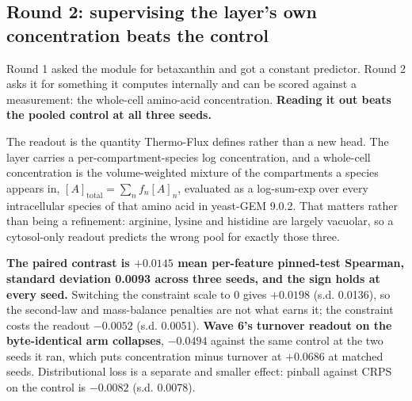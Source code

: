 \subsection{Round 2: supervising the layer's own concentration beats the control}
\label{sec:wave7-aa}

Round 1 asked the module for betaxanthin and got a constant predictor. Round 2 asks it for
something it computes internally and can be scored against a measurement: the whole-cell
amino-acid concentration. \textbf{Reading it out beats the pooled control at all three
seeds.}

The readout is the quantity Thermo-Flux defines rather than a new head. The layer carries a
per-compartment-species log concentration, and a whole-cell concentration is the
volume-weighted mixture of the compartments a species appears in,
$[A]_{\mathrm{total}} = \sum_n f_n [A]_n$, evaluated as a log-sum-exp over every
intracellular species of that amino acid in yeast-GEM 9.0.2. That matters rather than being
a refinement: arginine, lysine and histidine are largely vacuolar, so a cytosol-only readout
predicts the wrong pool for exactly those three.



\textbf{The paired contrast is $+0.0145$ mean per-feature pinned-test Spearman, standard
deviation 0.0093 across three seeds, and the sign holds at every seed.} Switching the
constraint scale to 0 gives $+0.0198$ (s.d. 0.0136), so the second-law and mass-balance
penalties are not what earns it; the constraint costs the readout $-0.0052$ (s.d. 0.0051).
\textbf{Wave 6's turnover readout on the byte-identical arm collapses}, $-0.0494$ against
the same control at the two seeds it ran, which puts concentration minus turnover at
$+0.0686$ at matched seeds. Distributional loss is a separate and smaller effect: pinball
against CRPS on the control is $-0.0082$ (s.d. 0.0078).

